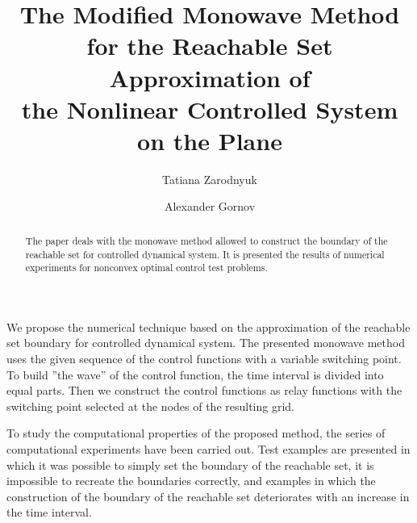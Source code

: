 \documentclass[12pt]{llncs}
\begin{document}
%
\fi
\title{The Modiﬁed Monowave Method \\for the Reachable Set Approximation of \\the Nonlinear Controlled System on the Plane
}
\author{Tatiana Zarodnyuk%
  \and
  Alexander Gornov%
}

\maketitle

\begin{abstract}
The paper deals with the monowave method allowed to construct the boundary of the reachable set for controlled dynamical system. It is presented the results of numerical experiments for nonconvex optimal control test problems.

\end{abstract}
We propose the numerical technique based on the approximation of the reachable set boundary for controlled dynamical system. The presented monowave method uses the given sequence of the control functions with a variable switching point. To build ''the wave'' of the control function, the time interval is divided into equal parts. Then we construct the control functions as relay functions with the switching point selected at the nodes of the resulting grid. 

To study the computational properties of the proposed method, the series of computational experiments have been carried out. Test examples are presented in which it was possible to simply set the boundary of the reachable set,  it is impossible to recreate the boundaries correctly, and examples in which the construction of the boundary of the reachable set deteriorates with an increase in the time interval. 
\end{document}

